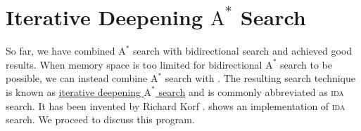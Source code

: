 \section{Iterative Deepening $\mathrm{A}^*$ Search \label{sec:ida-star-search}}
So far, we have combined $\mathrm{A}^*$ search with bidirectional search and achieved good results.  When
memory space is too limited for bidirectional $\mathrm{A}^*$ search to be possible, we can instead
combine $\mathrm{A}^*$ search with .  The resulting search technique is known as
\href{https://en.wikipedia.org/wiki/Iterative_deepening_A*}{\color{blue}iterative deepening $\mathrm{A}^*$ search}
and is commonly abbreviated as  \textsc{ida} search.  
It has been invented by Richard Korf \cite{korf:1985}.
shows an implementation of \textsc{ida} search.  We proceed to discuss this program.

